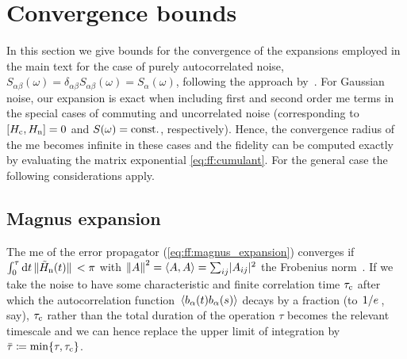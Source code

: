 \section{Convergence bounds}\label{sec:app:ff:convergence}
In this section we give bounds for the convergence of the expansions employed in the main text for the case of purely autocorrelated noise, $S_{\alpha\beta}(\omega) = \delta_{\alpha\beta}S_{\alpha\beta}(\omega) =  S_\alpha(\omega)$, following the approach by~\textcite{Green2013}.
For Gaussian noise, our expansion is exact when including first and second order \acrfull{me} terms in the special cases of commuting and uncorrelated noise (corresponding to $\comm{\Hc}{\Hn} = 0$ and $S(\omega)=\mathrm{const.}$, respectively).
Hence, the convergence radius of the \gls{me} becomes infinite in these cases and the fidelity can be computed exactly by evaluating the matrix exponential \cref{eq:ff:cumulant}.
For the general case the following considerations apply.

\subsection{Magnus expansion}\label{subsec:app:ff:convergence:magnus_expansion}
The \gls{me} of the error propagator (\cref{eq:ff:magnus_expansion}) converges if $\int_0^\tau\dd{t}\norm*{\tilde{H}_{\mathrm{n}}(t)} < \pi$ with $\norm{A}^2 = \expval{A,A} = \sum_{ij}\lvert A_{ij}\rvert^2$ the Frobenius norm~\cite{Moan1999}.
If we take the noise to have some characteristic and finite correlation time $\tau_{\mathrm{c}}$ after which the autocorrelation function $\expval*{b_\alpha(t)b_\alpha(s)}$ decays by a fraction (to $\flatfrac{1}{e}$, say), $\tau_{\mathrm{c}}$ rather than the total duration of the operation $\tau$ becomes the relevant timescale and we can hence replace the upper limit of integration by $\bar{\tau}\coloneqq\min\{\tau, \tau_{\mathrm{c}}\}$.

